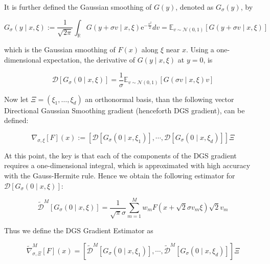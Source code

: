It is further defined the Gaussian smoothing of $G(y)$, denoted as $G_\sigma (y)$, by

\begin{equation}
	G_{\sigma}(y \mid x, \xi):=\frac{1}{\sqrt{2 \pi}} \int_{\mathbb{R}} G(y+\sigma v \mid x, \xi) \mathrm{e}^{-\frac{v^{2}}{2}} d v=\mathbb{E}_{v \sim \mathcal{N}(0,1)}[G(y+\sigma v \mid x, \xi)] 
\end{equation}

which is the Gaussian smoothing of $F(x)$ along $\xi$ near $x$. Using a one-dimensional expectation, the derivative of $G(y \mid x, \xi)$ at $y=0$, is 

\begin{equation}\label{DerivativeSmoothingSection}
	\mathcal{D}\left[G_{\sigma}(0 \mid x, \xi)\right]=\frac{1}{\sigma} \mathbb{E}_{v \sim \mathcal{N}(0,1)}[G(\sigma v \mid x, \xi) v] 
\end{equation}

Now let $\Xi = \left(\xi_1,\dots,\xi_d\right)$ an orthonormal basis, than the following vector Directional Gaussian Smoothing gradient (henceforth DGS gradient), can be defined:

\begin{defn}\label{DGSGradient}

	\begin{equation}
		\nabla_{\sigma, \xi}[F](x):=\left[\mathcal{D}\left[G_{\sigma}\left(0 \mid x, \xi_{1}\right)\right], \cdots, \mathcal{D}\left[G_{\sigma}\left(0 \mid x, \xi_{d}\right)\right]\right] \Xi 
	\end{equation}

\end{defn}

At this point, the key is that each of the components of the DGS gradient requires a one-dimensional integral, which is approximated with high accuracy with the Gauss-Hermite rule. Hence we obtain the following estimator for $\mathcal{D}\left[G_{\sigma}(0 \mid x, \xi)\right]$:

\begin{equation}\label{GHApproximationSmothedSection}
	\tilde{\mathcal{D}}^{M}\left[G_{\sigma}(0 \mid x, \xi)\right]=\frac{1}{\sqrt{\pi} \sigma} \sum_{m=1}^{M} w_{m} F\left(x+\sqrt{2} \sigma v_{m} \xi\right) \sqrt{2} v_{m} 
\end{equation}

Thus we define the DGS Gradient Estimator as 

\begin{defn}\label{DGSGradientEstimator}

	\begin{equation}\label{DGSGradientEstimatorEq}
		\widetilde{\nabla}_{\sigma, \Xi}^{M}[F](x)=\left[\widetilde{\mathcal{D}}^{M}\left[G_{\sigma}\left(0 \mid x, \xi_{1}\right)\right], \cdots, \widetilde{\mathcal{D}}^{M}\left[G_{\sigma}\left(0 \mid x, \xi_{d}\right)\right]\right] \Xi 
	\end{equation}

\end{defn}

